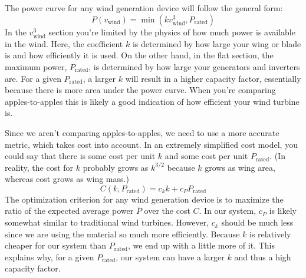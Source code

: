\documentclass[11pt]{amsart}
\begin{document}
The power curve for any wind generation device will follow the general form:
\begin{equation}
P(v_{\mathrm{wind}}) = \min(k v_{\mathrm{wind}}^3, P_{\mathrm{rated}})
\end{equation}
In the $v_{\mathrm{wind}}^3$ section you're limited by the physics of
how much power is available in the wind.  Here, the coefficient $k$ is
determined by how large your wing or blade is and how efficiently it
is used.  On the other hand, in the flat section, the maximum power,
$P_{\mathrm{rated}}$, is determined by how large your generators and
inverters are.  For a given $P_{\mathrm{rated}}$, a larger $k$ will
result in a higher capacity factor, essentially because there is more
area under the power curve.  When you're comparing apples-to-apples
this is likely a good indication of how efficient your wind turbine
is.

\begin{center}
\end{center}

Since we aren't comparing apples-to-apples, we need to use a more
accurate metric, which takes cost into account.  In an extremely
simplified cost model, you could say that there is some cost per unit
$k$ and some cost per unit $P_{\mathrm{rated}}$.  (In reality, the
cost for $k$ probably grows as $k^{3/2}$ because $k$ grows as wing
area, whereas cost grows as wing mass.)
\begin{equation}
C(k, P_{\mathrm{rated}}) = c_k k + c_P P_{\mathrm{rated}}
\end{equation}
The optimization criterion for any wind generation device is to
maximize the ratio of the expected average power $\bar{P}$ over the
cost $C$.  In our system, $c_P$ is likely somewhat similar to
traditional wind turbines.  However, $c_k$ should be much less since
we are using the material so much more efficiently.  Because $k$ is
relatively cheaper for our system than $P_{\mathrm{rated}}$, we end up
with a little more of it.  This explains why, for a given
$P_{\mathrm{rated}}$, our system can have a larger $k$ and thus a high
capacity factor.
\end{document}
